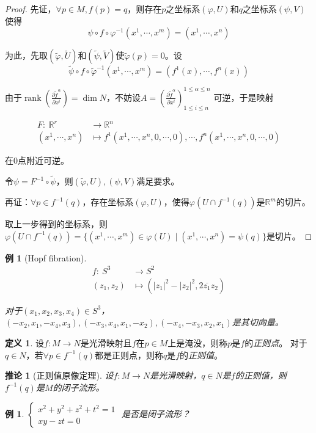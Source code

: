 \documentclass[winfonts,UTF8,c5size,a4paper,fancyhdr,hyperref,titlepage,nocap]{ctexart}
\newtheorem{cor}[thm]{推论}
\newtheorem{exa}[thm]{例}
\theoremstyle{definition}
\newtheorem{defn}[thm]{定义}
\theoremstyle{remark}
\numberwithin{equation}{subsection}
\newcommand{\Real}{\mathbb{R}}
\newcommand{\red}{\color{red}}
\newcommand{\pfrac}[2]{\frac{\partial{#1}}{\partial{#2}}}
\newcommand{\rank}{\operatorname{rank}}
\newcommand{\mapdes}[5]
  {
    \begin{align*}
      #1\colon\  #2 & \longrightarrow  #3 \\
            #4 & \mapsto  #5
    \end{align*}
  }
\begin{document}
\begin{proof}
先证，$\forall p\in M,f(p)=q$，则存在$p$之坐标系$(\varphi,U)$和$q$之坐标系$(\psi,V)$使得
\begin{equation*}
\psi\circ f\circ\varphi^{-1}(x^1,\cdots,x^m)=(x^1,\cdots,x^n)
\end{equation*}

为此，先取$(\widetilde{\varphi},\widetilde{U})$和$(\widetilde{\psi},\widetilde{V})$使$\widetilde{\varphi}(p)=0$。设
\begin{equation*}
\widetilde{\psi}\circ f\circ\widetilde{\varphi}^{-1}(x^1,\cdots,x^m)=(f^1(x),\cdots,f^n(x))
\end{equation*}

由于$\rank(\pfrac{\widetilde{f}^{\alpha}}{x^i})=\dim N$，不妨设$A=(\pfrac{\widetilde{f}^{\alpha}}{x^i})^{1\leqslant\alpha\leqslant n}_{1\leqslant i\leqslant n}$ 可逆，于是映射
\mapdes{F}{\Real^r}{\Real^n}{(x^1,\cdots,x^n)}{f^1(x^1,\cdots,x^n,0,\cdots,0),\cdots,f^n(x^1,\cdots,x^n,0,\cdots,0)}
在$0$点附近可逆。

令$\psi=F^{-1}\circ\widetilde{\psi}$，则$(\widetilde{\varphi},U),(\psi,V)$满足要求。

再证：$\forall p\in f^{-1}(q)$，存在坐标系$(\varphi,U)$，使得$\varphi(U\cap f^{-1}(q))$是$\Real^m$的切片。

取上一步得到的坐标系，则$\varphi(U\cap f^{-1}(q))=\{(x^1,\cdots,x^m)\in\varphi(U)\mid(x^1,\cdots,x^n)=\psi(q)\}$是切片。
\end{proof}
\begin{exa}[Hopf fibration]
\mapdes{f}{S^3}{S^2}{(z_1,z_2)}{(|z_1|^2-|z_2|^2,2\overline{z_1}z_2)}
对于$(x_1,x_2,x_3,x_4)\in S^3$，$(-x_2,x_1,-x_4,x_3),(-x_3,x_4,x_1,-x_2),(-x_4,-x_3,x_2,x_1)$是其切向量。
\end{exa}
\begin{defn}
  设$f\colon M\to N$是光滑映射且$f$在$p\in M$上是淹没，则称$p$是$f$的\emph{\red 正则点}。
对于$q\in N$，若$\forall p\in f^{-1}(q)$都是正则点，则称$q$是$f$的\emph{\red 正则值}。
\end{defn}
\begin{cor}[正则值原像定理]\label{正则值原像定理}
设$f\colon M\to N$是光滑映射，$q\in N$是$f$的正则值，则$f^{-1}(q)$是$M$的闭子流形。
\end{cor}
\begin{exa}
  $\begin{cases}
  x^2+y^2+z^2+t^2=1\\
  xy-zt=0
  \end{cases}$
是否是闭子流形？
\end{exa}
\end{document}
